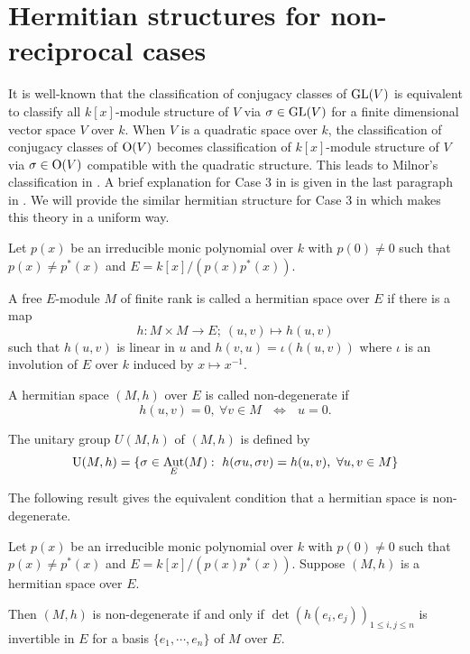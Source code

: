 \documentclass[12pt]{amsart}
\DeclareMathOperator{\Aut}{Aut}
\begin{document}
\section{Hermitian structures for non-reciprocal cases}

It is well-known that the classification of conjugacy classes of ${\rm GL}(V)$ is equivalent to classify all $k[x]$-module structure of $V$ via $\sigma \in {\rm GL}(V)$ for a finite dimensional  vector space $V$ over $k$.  When $V$ is a quadratic space over $k$, the classification of conjugacy classes of ${\rm O}(V)$ becomes classification of $k[x]$-module structure of $V$  via $\sigma \in {\rm O}(V)$ compatible with the quadratic structure. This leads to Milnor's classification in \cite[\S 3]{Mil}. A brief explanation for Case 3 in \cite[\S 3]{Mil} is given in the last paragraph in \cite[p.94]{Mil}. We will provide the similar hermitian structure for Case 3 in \cite[\S 3]{Mil} which makes this theory in a uniform way. 

\begin{dfn} Let $p(x)$ be an irreducible monic polynomial over $k$ with $p(0)\neq 0$ such that $p(x)\neq p^*(x)$ and $E=k[x]/(p(x)p^*(x))$. 

A free $E$-module $M$ of finite rank is called a hermitian space over $E$ if there is a map 
$$ h: M\times M \rightarrow E; \ (u, v) \mapsto h(u, v)$$  such that $h(u, v)$ is linear in $u$ and $h(v, u) = \iota (h(u, v))$ where $\iota$ is an involution of $E$ over $k$ induced by $x\mapsto x^{-1}$. 

A hermitian space $(M, h)$ over $E$ is called non-degenerate if  
$$ h(u, v)= 0 , \ \forall v\in M \ \ \ \Leftrightarrow \ \ \ u=0. $$

The unitary group $U(M, h)$ of $(M, h)$ is defined by 
$$ {\rm U}(M, h)= \{ \sigma \in \Aut_E(M): \ h(\sigma u, \sigma v) = h(u, v),  \ \forall u, v\in M \} $$
\end{dfn}

The following result gives the equivalent condition that a hermitian space is non-degenerate.


\begin{prop} \label{non-degenerate} Let $p(x)$ be an irreducible monic polynomial over $k$ with $p(0)\neq 0$ such that $p(x)\neq p^*(x)$ and $E=k[x]/(p(x)p^*(x))$. 
Suppose $(M, h)$ is a hermitian space over $E$. 

Then $(M, h)$ is non-degenerate if and only if $\det(h(e_i, e_j))_{1\leq i, j \leq n}$ is invertible in $E$ for a basis $\{ e_1, \cdots, e_n \}$ of $M$ over $E$.
\end{prop}
\end{document}
